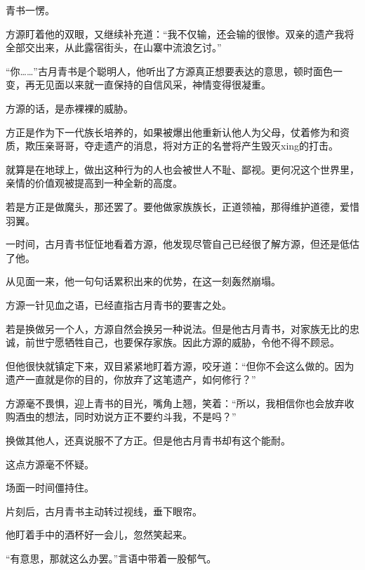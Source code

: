 \begin{this_body}
青书一愣。

方源盯着他的双眼，又继续补充道：“我不仅输，还会输的很惨。双亲的遗产我将全部交出来，从此露宿街头，在山寨中流浪乞讨。”

“你……”古月青书是个聪明人，他听出了方源真正想要表达的意思，顿时面色一变，再无见面以来就一直保持的自信风采，神情变得很凝重。

方源的话，是赤裸裸的威胁。

方正是作为下一代族长培养的，如果被爆出他重新认他人为父母，仗着修为和资质，欺压亲哥哥，夺走遗产的消息，将对方正的名誉将产生毁灭xing的打击。

就算是在地球上，做出这种行为的人也会被世人不耻、鄙视。更何况这个世界里，亲情的价值观被提高到一种全新的高度。

若是方正是做魔头，那还罢了。要他做家族族长，正道领袖，那得维护道德，爱惜羽翼。

一时间，古月青书怔怔地看着方源，他发现尽管自己已经很了解方源，但还是低估了他。

从见面一来，他一句句话累积出来的优势，在这一刻轰然崩塌。

方源一针见血之语，已经直指古月青书的要害之处。

若是换做另一个人，方源自然会换另一种说法。但是他古月青书，对家族无比的忠诚，前世宁愿牺牲自己，也要保存家族。因此方源的威胁，令他不得不顾忌。

但他很快就镇定下来，双目紧紧地盯着方源，咬牙道：“但你不会这么做的。因为遗产一直就是你的目的，你放弃了这笔遗产，如何修行？”

方源毫不畏惧，迎上青书的目光，嘴角上翘，笑着：“所以，我相信你也会放弃收购酒虫的想法，同时劝说方正不要约斗我，不是吗？”

换做其他人，还真说服不了方正。但是他古月青书却有这个能耐。

这点方源毫不怀疑。

场面一时间僵持住。

片刻后，古月青书主动转过视线，垂下眼帘。

他盯着手中的酒杯好一会儿，忽然笑起来。

“有意思，那就这么办罢。”言语中带着一股郁气。

\end{this_body}

